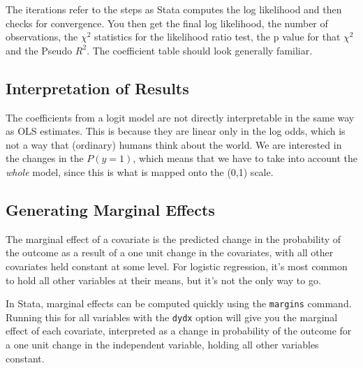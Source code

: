 \documentclass[12pt]{article}
\begin{document}
The iterations refer to the steps as Stata computes the log likelihood
and then checks for convergence. You then get the final log
likelihood, the number of observations, the $\chi^2$ statistics for
the likelihood ratio test, the p value for that $\chi^2$ and the
Pseudo $R^2$. The coefficient table should look generally familiar. 


\subsection{Interpretation of Results}

The coefficients from a logit model are not directly interpretable in
the same way as OLS estimates. This is because they are linear only in
the log odds, which is not a way that (ordinary) humans think about
the world. We are interested in the changes in the $P(y=1)$, which
means that we have to take into account the \textit{whole} model,
since this is what is mapped onto the (0,1) scale. 



\subsection{Generating Marginal Effects}

The marginal effect of a covariate is the predicted change in the
probability of the outcome as a result of a one unit change in the
covariates, with all other covariates held constant at some level. For
logistic regression, it's most common to hold all other variables at
their means, but it's not the only way to go. 

In Stata, marginal effects can be computed quickly using the
\texttt{margins} command. Running this for all variables with the
\texttt{dydx} option will give you the marginal effect of each
covariate, interpreted as a change in probability of the outcome for a
one unit change in the independent variable, holding all other
variables constant. 
\end{document}
